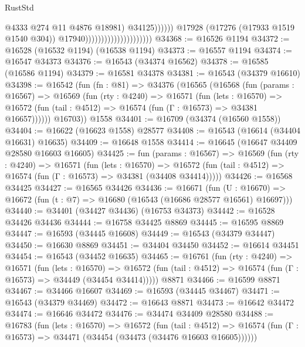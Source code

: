 \begin{lexlean}{RustStd}
\begin{coremodule}
                                                            @4333
                                                            @274
                                                            @11
                                                            @4876
                                                            @18981)
                                                          @34125))))))
                                              @17928
                                              (@17276 (@17933 @1519 @1540 @304))
                                              @17940)))))))))))))))))))))
@34368 := @16526 @1194
@34372 := @16528 (@16532 @1194) (@16538 @1194)
@34373 := @16557 @1194
@34374 := @16547 @34373
@34376 := @16543 (@34374 @16562)
@34378 := @16585 (@16586 @1194)
@34379 := @16581 @34378
@34381 := @16543 (@34379 @16610)
@34398 := @16542
    (fun (fn : @81) =>
    @34376
      (@16565
        (@16568
          (fun (params : @16567) =>
          @16569
            (fun (rty : @4240) =>
            @16571
              (fun (lets : @16570) =>
              @16572 (fun (tail : @4512) => @16574 (fun (Γ : @16573) => @34381 @16657))))))
        @16703))
    @1558
@34401 := @16709 (@34374 (@16560 @1558))
@34404 := @16622 (@16623 @1558) @28577
@34408 := @16543 (@16614 (@34404 @16631) @16635)
@34409 := @16648 @1558
@34414 := @16645 (@16647 @34409 @28580 @16603 @16605)
@34425 := fun (params : @16567) =>
  @16569
    (fun (rty : @4240) =>
    @16571
      (fun (lets : @16570) =>
      @16572 (fun (tail : @4512) => @16574 (fun (Γ : @16573) => @34381 (@34408 @34414)))))
@34426 := @16568 @34425
@34427 := @16565 @34426
@34436 := @16671
    (fun (U : @16670) => @16672 (fun (t : @7) => @16680 (@16543 (@16686 @28577 @16561) @16697)))
@34440 := @34401 (@34427 @34436) (@16753 @34373)
@34442 := @16528 @34426 @34436
@34444 := @16758 @34425 @8869
@34445 := @16595 @8869
@34447 := @16593 (@34445 @16608)
@34449 := @16543 (@34379 @34447)
@34450 := @16630 @8869
@34451 := @34404 @34450
@34452 := @16614 @34451
@34454 := @16543 (@34452 @16635)
@34465 := @16761
    (fun (rty : @4240) =>
    @16571
      (fun (lets : @16570) =>
      @16572 (fun (tail : @4512) => @16574 (fun (Γ : @16573) => @34449 (@34454 @34414)))))
    @8871
@34466 := @16599 @8871
@34467 := @34466 @16607
@34469 := @16593 (@34445 @34467)
@34471 := @16543 (@34379 @34469)
@34472 := @16643 @8871
@34473 := @16642 @34472
@34474 := @16646 @34472
@34476 := @34474 @34409 @28580
@34488 := @16783
    (fun (lets : @16570) =>
    @16572
      (fun (tail : @4512) =>
      @16574 (fun (Γ : @16573) => @34471 (@34454 (@34473 (@34476 @16603 @16605))))))

\end{coremodule}
\end{lexlean}
